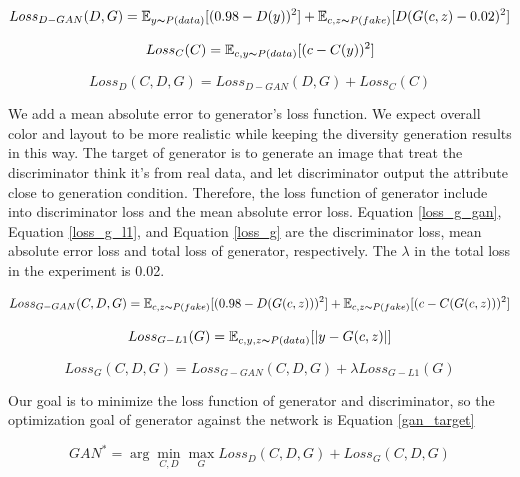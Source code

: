 \begin{equation}
    Loss_{D-GAN}(D,G)=
    \mathbb{E}_{y\thicksim P(data)}[(0.98-D(y))^2]+
    \mathbb{E}_{c,z\thicksim P(fake)}[D(G(c,z)-0.02)^2]
    \label{loss_d_gan}
\end{equation}


\begin{equation}
    Loss_{C}(C)=
    \mathbb{E}_{c,y\thicksim P(data)}[(c-C(y))^2]
    \label{loss_d_c}
\end{equation}

\begin{equation}
    Loss_{D}(C,D,G)=
    Loss_{D-GAN}(D,G)+
    Loss_{C}(C)
    \label{loss_d}
\end{equation}

We add a mean absolute error to generator's loss function.
We expect overall color and layout to be more realistic while keeping the diversity generation results in this way.
The target of generator is to generate an image that treat the discriminator think it's from real data,
    and let discriminator output the attribute close to generation condition.
Therefore, the loss function of generator include into discriminator loss and the mean absolute error loss.
Equation \eqref{loss_g_gan}, Equation \eqref{loss_g_l1}, and Equation \eqref{loss_g} are the discriminator loss,
    mean absolute error loss and total loss of generator, respectively.
The $\lambda$ in the total loss in the experiment is 0.02.

\begin{equation}
    Loss_{G-GAN}(C,D,G)=
    \mathbb{E}_{c,z\thicksim P(fake)}[(0.98-D(G(c,z)))^2]+
    \mathbb{E}_{c,z\thicksim P(fake)}[(c-C(G(c,z)))^2]
    \label{loss_g_gan}
\end{equation}

\begin{equation}
    Loss_{G-L1}(G)=
    \mathbb{E}_{c,y,z\thicksim P(data)}[|y-G(c,z)|]
    \label{loss_g_l1}
\end{equation}

\begin{equation}
    Loss_{G}(C,D,G)=
    Loss_{G-GAN}(C,D,G)+
    \lambda Loss_{G-L1}(G)
    \label{loss_g}
\end{equation}

Our goal is to minimize the loss function of generator and discriminator,
    so the optimization goal of generator against the network is Equation \eqref{gan_target}

\begin{equation}
    GAN^*=\arg \min_{C,D} \max_{G}Loss_{D}(C,D,G)+Loss_{G}(C,D,G)
    \label{gan_target}
\end{equation}


